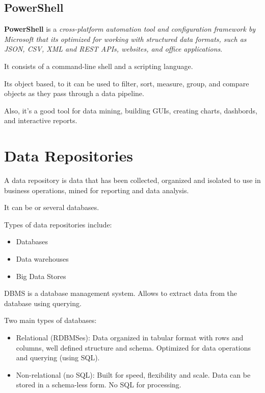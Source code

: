 \documentclass[../../ibm_data_analysis.tex]{subfiles}
\begin{document}
    \subsection{PowerShell}

    \begin{mydef}
        \textbf{PowerShell} is a \textit{cross-platform automation tool and configuration framework by Microsoft that its optimized for working with structured data formats, such as JSON, CSV, XML and REST APIs, websites, and office applications}.
    \end{mydef}

    It consists of a command-line shell and a scripting language.

    Its object based, to it can be used to filter, sort, measure, group, and compare objects as they pass through a data pipeline.

    Also, it's a good tool for data mining, building GUIs, creating charts, dashbords, and interactive reports.

    \section{Data Repositories}

    A data repository is data that has been collected, organized and isolated to use in business operations, mined for reporting and data analysis.

    It can be or several databases.

    Types of data repositories include:
    \begin{itemize}
        \item Databases
        \item Data warehouses
        \item Big Data Stores
    \end{itemize}

    \begin{mydef}
        DBMS is a database management system. Allows to extract data from the database using querying.
    \end{mydef}

    Two main types of databases:
    \begin{itemize}
        \item Relational (RDBMSes): Data organized in tabular format with rows and columns, well defined structure and schema. Optimized for data operations and querying (using SQL).
        \item Non-relational (no SQL): Built for speed, flexibility and scale. Data can be stored in a schema-less form. No SQL for processing. 
    \end{itemize}
\end{document}

